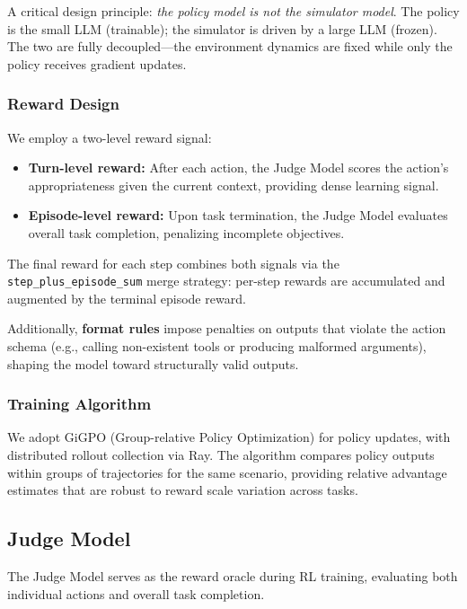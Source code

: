 A critical design principle: \emph{the policy model is not the simulator model}. The policy is the small LLM (trainable); the simulator is driven by a large LLM (frozen). The two are fully decoupled---the environment dynamics are fixed while only the policy receives gradient updates.

\subsubsection{Reward Design}

We employ a two-level reward signal:

\begin{itemize}
    \item \textbf{Turn-level reward:} After each action, the Judge Model scores the action's appropriateness given the current context, providing dense learning signal.
    \item \textbf{Episode-level reward:} Upon task termination, the Judge Model evaluates overall task completion, penalizing incomplete objectives.
\end{itemize}

The final reward for each step combines both signals via the \texttt{step\_plus\_episode\_sum} merge strategy: per-step rewards are accumulated and augmented by the terminal episode reward.

Additionally, \textbf{format rules} impose penalties on outputs that violate the action schema (e.g., calling non-existent tools or producing malformed arguments), shaping the model toward structurally valid outputs.

\subsubsection{Training Algorithm}

We adopt GiGPO (Group-relative Policy Optimization) for policy updates, with distributed rollout collection via Ray. The algorithm compares policy outputs within groups of trajectories for the same scenario, providing relative advantage estimates that are robust to reward scale variation across tasks.
\fi

\label{sec:rl}

\iffalse
\subsection{Judge Model}
\label{sec:judge}


The Judge Model serves as the reward oracle during RL training, evaluating both individual actions and overall task completion.

